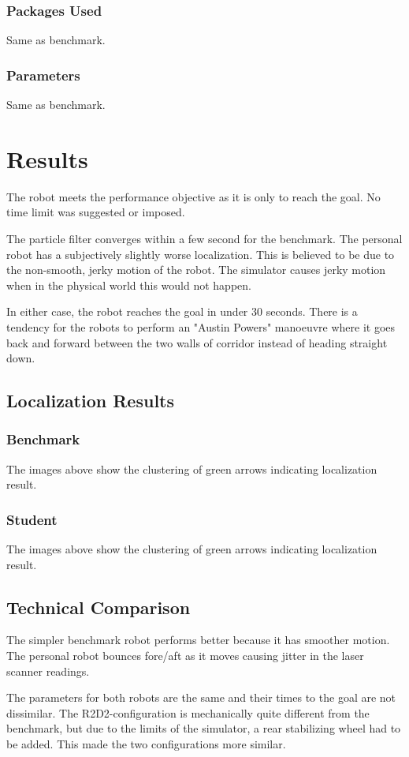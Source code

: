 \documentclass[10pt,journal,compsoc]{IEEEtran}
\begin{document}
\subsubsection{Packages Used}
Same as benchmark.
\subsubsection{Parameters}
Same as benchmark.

\section{Results}
The robot meets the performance objective as it is only to reach the goal. No time limit was suggested or imposed.

The particle filter converges within a few second for the benchmark. The personal robot has a subjectively slightly worse localization. This is believed to be due to the non-smooth, jerky motion of the robot. The simulator causes jerky motion when in the physical world this would not happen.

In either case, the robot reaches the goal in under 30 seconds. There is a tendency for the robots to perform an "Austin Powers" manoeuvre where it goes back and forward between the two walls of corridor instead of heading straight down.

\subsection{Localization Results}
\subsubsection{Benchmark}
The images above show the clustering of green arrows indicating localization result.
\subsubsection{Student}
The images above show the clustering of green arrows indicating localization result.

\subsection{Technical Comparison} %
The simpler benchmark robot performs better because it has smoother motion. The personal robot bounces fore/aft as it moves causing jitter in the laser scanner readings.

The parameters for both robots are the same and their times to the goal are not dissimilar. The R2D2-configuration is mechanically quite different from the benchmark, but due to the limits of the simulator, a rear stabilizing wheel had to be added. This made the two configurations more similar.
\end{document}
